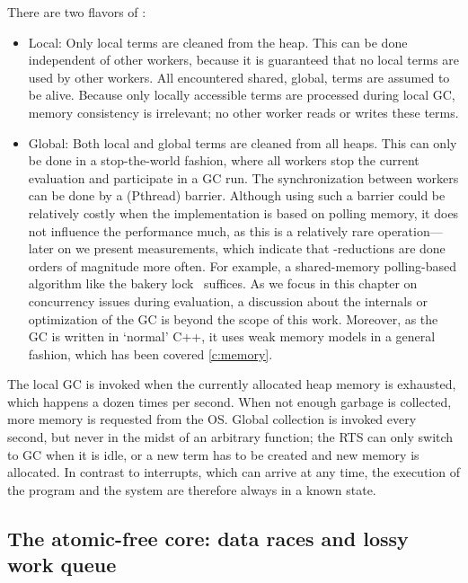 There are two flavors of :
\begin{itemize}
\item Local:
	Only local terms are cleaned from the heap.
	This can be done independent of other workers, because it is guaranteed that no local terms are used by other workers.
	All encountered shared, \ie global, terms are assumed to be alive.
	Because only locally accessible terms are processed during local \ac{GC}, memory consistency is irrelevant; no other worker reads or writes these terms.
\item Global:
	Both local and global terms are cleaned from all heaps.
	This can only be done in a stop-the-world fashion, where all workers stop the current evaluation and participate in a \ac{GC} run.
	The synchronization between workers can be done by a (Pthread) barrier.
	Although using such a barrier could be relatively costly when the implementation is based on polling memory, it does not influence the performance much, as this is a relatively rare operation---later on we present measurements, which indicate that \fxbeta-reductions are done orders of magnitude more often.
	For example, a shared-memory polling-based algorithm like the bakery lock~\cite{lamport:mutex} suffices.
	As we focus in this chapter on concurrency issues during evaluation, a discussion about the internals or optimization of the \ac{GC} is beyond the scope of this work.
	Moreover, as the \ac{GC} is written in `normal' C++, it uses weak memory models in a general fashion, which has been covered \cref{c:memory}.
\end{itemize}
The local \ac{GC} is invoked when the currently allocated heap memory is exhausted, which happens a dozen times per second.
When not enough garbage is collected, more memory is requested from the \ac{OS}.
Global collection is invoked every second, but never in the midst of an arbitrary function; the \ac{RTS} can only switch to \ac{GC} when it is idle, or a new term has to be created and new memory is allocated.
In contrast to interrupts, which can arrive at any time, the execution of the program and the system are therefore always in a known state.

\subsection{The atomic-free core: data races and lossy work queue}

\label{s:concurrency:races}


